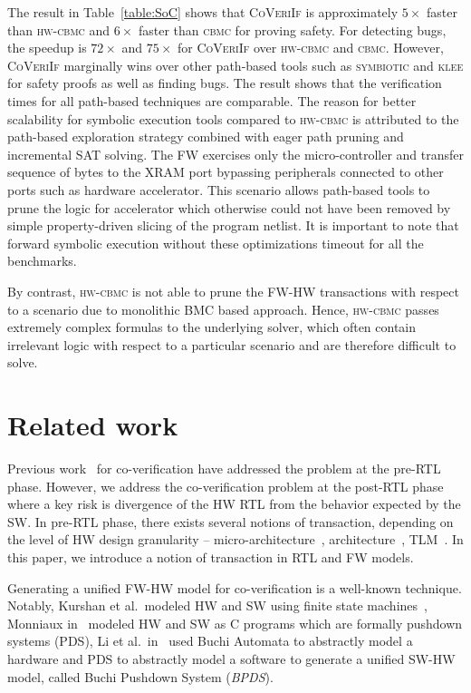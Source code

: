 \documentclass[sigconf]{acmart}
\newcommand{\tool}[1]{\textsc{#1}\xspace}
\newcommand{\cbmcv}{\tool{cbmc}}
\newcommand{\hwcbmcv}{\tool{hw-cbmc}}
\newcommand{\verifox}{\tool{CoVeriIf}}
\newcommand{\klee}{\tool{klee}}
\newcommand{\symbiotic}{\tool{symbiotic}}
\begin{document}
The result in Table~\ref{table:SoC} shows that \verifox is approximately
$5\times$ faster than \hwcbmcv and $6\times$ faster than \cbmcv for proving
safety.  For detecting bugs, the speedup is $72\times$ and $75\times$ for
\verifox over \hwcbmcv and \cbmcv.  However, \verifox marginally wins over
other path-based tools such as \symbiotic and \klee for safety proofs as
well as finding bugs. The result shows that the verification times for all
path-based techniques are comparable.  The reason for better scalability for
symbolic execution tools compared to \hwcbmcv is attributed to the path-based 
exploration strategy combined with eager path pruning and incremental SAT
solving. The FW exercises only the micro-controller
and transfer sequence of bytes to the XRAM port bypassing peripherals
connected to other ports such as hardware accelerator.  This scenario
allows path-based tools to prune the logic for accelerator which otherwise
could not have been removed by simple property-driven slicing of the
program netlist.  It is important to note that forward symbolic execution without
these optimizations timeout for all the benchmarks.

By contrast, \hwcbmcv is not able to prune the FW-HW transactions with
respect to a scenario due to monolithic BMC based approach.  Hence, \hwcbmcv
passes extremely complex formulas to the underlying solver, which often
contain irrelevant logic with respect to a particular scenario and are
therefore difficult to solve.

\section{Related work}

Previous work~\cite{codes14,codes15,fmcad13,memocode06} for 
co-verification have addressed the problem at the pre-RTL phase. 
However, we address the co-veri\-fi\-cation problem at the post-RTL
phase~\cite{fase10,vlsid13} where a key risk is divergence of the 
HW RTL from the behavior expected by the SW. In pre-RTL phase, 
there exists several notions of transaction, depending on the level 
of HW design granularity -- micro-architecture~\cite{mcbmq},
architecture~\cite{mcbmq}, TLM~\cite{tlm-book,hvc}. In this paper, 
we introduce a notion of transaction in RTL and FW models.      

Generating a unified FW-HW model for co-verification is a well-known 
technique. Notably, Kurshan et al.~modeled HW and 
SW using finite state machines~\cite{fmsd02}, Monniaux in~\cite{emsoft07} modeled
HW and SW as C programs which are formally pushdown systems (PDS), 
Li et al.~in~\cite{fase10} used Buchi Automata to abstractly
model a hardware and PDS to abstractly model a software to generate a unified SW-HW model, 
called Buchi Pushdown System ({\em BPDS}).  
\end{document}
